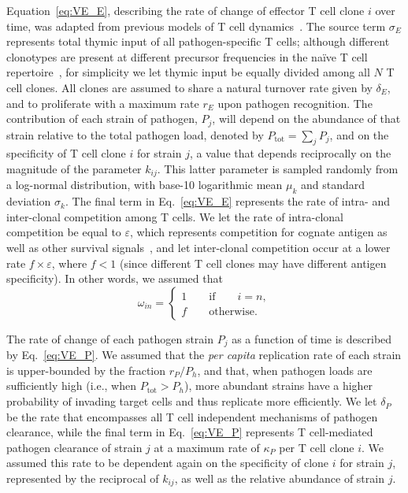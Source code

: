 Equation~\eqref{eq:VE_E}, describing the rate of change of effector T cell clone $i$ over time, was adapted from previous models of T cell dynamics~\cite{jamaleddine2020quantifying,jamaleddine2022chronic,khadra2011investigating,jaberi2015continuum}. The source term $\sigma_E$ represents total thymic input of all pathogen-specific T cells; although different clonotypes are present at different precursor frequencies in the na\"{i}ve T cell repertoire~\cite{quigley2010convergent}, for simplicity we let thymic input be equally divided among all $N$ T cell clones. All clones are assumed to share a natural turnover rate given by $\delta_E$, and to proliferate with a maximum rate $r_E$ upon pathogen recognition. The contribution of each strain of pathogen, $P_j$, will depend on the abundance of that strain relative to the total pathogen load, denoted by $P_{\textrm{tot}} = \sum_j P_j$, and on the specificity of T cell clone $i$ for strain $j$, a value that depends reciprocally on the magnitude of the parameter $k_{ij}$. This latter parameter is sampled randomly from a log-normal distribution, with base-10 logarithmic mean $\mu_k$ and standard deviation $\sigma_k$. The final term in Eq.~\eqref{eq:VE_E} represents the rate of intra- and inter-clonal competition among T cells. We let the rate of intra-clonal competition be equal to $\varepsilon$, which represents competition for cognate antigen as well as other survival signals~\cite{khadra2009role,jamaleddine2020quantifying,jamaleddine2022chronic}, and let inter-clonal competition occur at a lower rate $f \times \varepsilon$, where $f<1$ (since different T cell clones may have different antigen specificity). In other words, we assumed that
%
\begin{equation*}
    \omega_{in} = 
    \begin{cases}
        1 \qquad \textrm{if} \qquad i=n, \\
        f \qquad \textrm{otherwise}.
    \end{cases}
\end{equation*}

The rate of change of each pathogen strain $P_j$ as a function of time is described by Eq.~\eqref{eq:VE_P}. We assumed that the \textit{per capita} replication rate of each strain is upper-bounded by the fraction $r_P/P_h$, and that, when pathogen loads are sufficiently high (i.e., when $P_{\textrm{tot}} > P_h$), more abundant strains have a higher probability of invading target cells and thus replicate more efficiently. We let $\delta_P$ be the rate that encompasses all T cell independent mechanisms of pathogen clearance, while the final term in Eq.~\eqref{eq:VE_P} represents T cell-mediated pathogen clearance of strain $j$ at a maximum rate of $\kappa_P$ per T cell clone $i$. We assumed this rate to be dependent again on the specificity of clone $i$ for strain $j$, represented by the reciprocal of $k_{ij}$, as well as the relative abundance of strain $j$.

